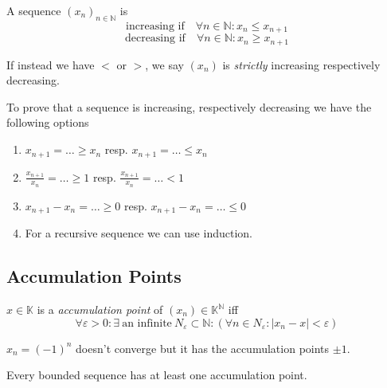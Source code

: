 \begin{definition}
   A sequence \((x_n)_{n \in \mathbb{N}}\) is
   \[\text{increasing if} \quad \forall n \in \mathbb{N}: x_n \leq x_{n+1}\]
   \[\text{decreasing if} \quad \forall n \in \mathbb{N}: x_n \geq x_{n+1}\]
\end{definition}
\begin{remark}[Terminology]
   If instead we have \(<\) or \(>\), we say \((x_n)\) is \emph{strictly} increasing respectively decreasing.
\end{remark}
\begin{remark}[Intuition]
   To prove that a sequence is increasing, respectively decreasing we have the following options
   \begin{enumerate}
      \item \(x_{n+1} = \ldots \geq x_n\) resp. \(x_{n+1} = \ldots \leq x_n\)
      \item \(\frac{x_{n+1}}{x_n} = \ldots \geq 1\) resp. \(\frac{x_{n+1}}{x_n} = \ldots < 1\)
      \item \(x_{n+1} - x_n = \ldots \geq 0\) resp. \(x_{n+1} - x_n = \ldots \leq 0\)
      \item For a recursive sequence we can use induction.
   \end{enumerate}
\end{remark}

\subsection{Accumulation Points}
\begin{definition}
   \(x \in \mathbb{K}\) is a \emph{accumulation point} of \((x_n) \in \mathbb{K}^\mathbb{N}\) iff
   \[\forall \varepsilon > 0: \exists~\text{an infinite}~N_{\varepsilon} \subset \mathbb{N}: (\forall n \in N_\varepsilon: |x_n - x| < \varepsilon)\]
\end{definition}
\begin{example}
   \(x_n = (-1)^n\) doesn't converge but it has the accumulation points \(\pm 1\).
\end{example}

\begin{theorem}\label{thm:bolzano}
   Every bounded sequence has at least one accumulation point.
\end{theorem}

